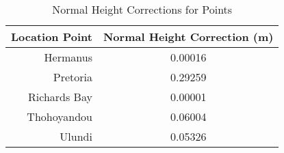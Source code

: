 \begin{table}[htbp]
  \centering
  \caption{Normal Height Corrections for Points}
    \begin{tabular}{rc}
    \toprule
    \multicolumn{1}{c}{\textbf{Location Point}} & \textbf{Normal Height Correction (m)} \\
    \midrule
    Hermanus & 0.00016 \\
    Pretoria & 0.29259 \\
    Richards Bay & 0.00001 \\
    Thohoyandou & 0.06004 \\
    Ulundi & 0.05326 \\
    \bottomrule
    \end{tabular}%
  \label{tab:addlabel}%
\end{table}%

